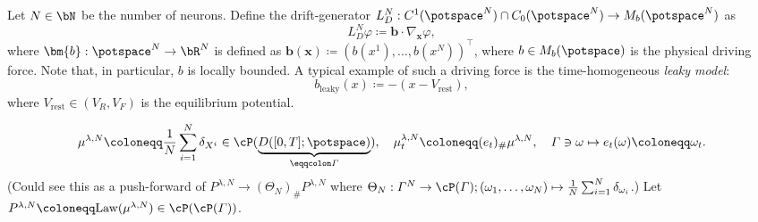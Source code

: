 Let \(N \in \bN\) be the number of neurons.
Define the drift-generator \(L_D^{N} : C^1(\potspace^N) \cap C_0(\potspace^N) \to M_b(\potspace^N)\) as
\begin{equation}
  L_D^{N}\varphi \coloneqq \bm{b} \cdot \nabla_{\bm{x}} \varphi,
\end{equation}
where \(\bm{b} : \potspace^N \to \bR^N\) is defined as \(\bm{b}(\bm{x}) \coloneqq (b(x^1), \dots, b(x^N))^\top\), where \(b \in M_b(\potspace)\) is the physical driving force.
Note that, in particular, \(b\) is locally bounded.
\newline
A typical example of such a driving force is the time-homogeneous \textit{leaky model}:
\begin{equation}
  b_{\mathrm{leaky}}(x) \coloneqq -(x - V_\mathrm{rest}),
\end{equation}
where \(V_\mathrm{rest} \in (V_R, V_F)\) is the equilibrium potential.



\begin{equation}
  \mu^{\lambda, N} \coloneqq \frac{1}{N} \sum_{i=1}^N \delta_{X^i} \in \cP(\underbrace{D([0,T]; \potspace)}_{\eqqcolon \varGamma}),
  \quad \mu_t^{\lambda, N} \coloneqq (e_t)_\# \mu^{\lambda, N},
  \quad \varGamma \ni \omega \mapsto e_t(\omega) \coloneqq \omega_t.
\end{equation}
(Could see this as a push-forward of \(P^{\lambda, N} \to (\Theta_N)_\# P^{\lambda, N}\) where \(\Theta_N : \varGamma^N \to \cP(\varGamma); (\omega_1,\dots,\omega_N) \mapsto \frac{1}{N} \sum_{i=1}^N \delta_{\omega_i}\).)
Let \(P^{\lambda, N} \coloneqq \mathrm{Law}(\mu^{\lambda, N}) \in \cP(\cP(\varGamma))\).

